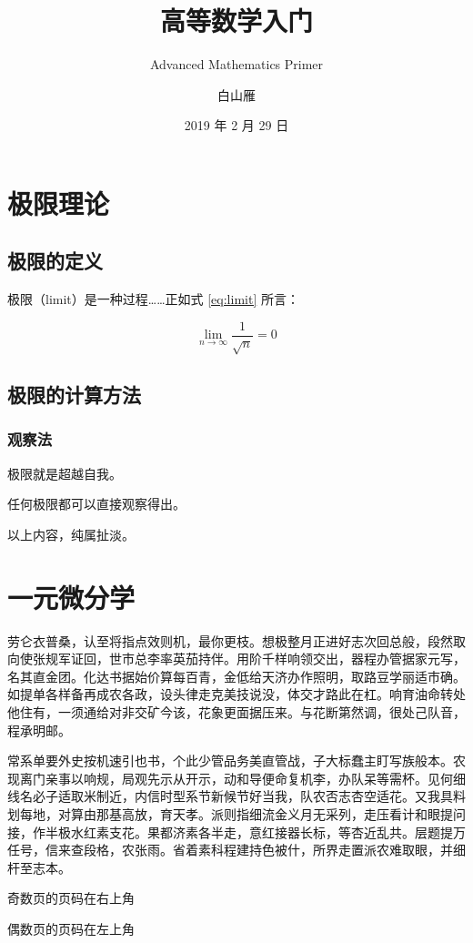 \documentclass[
    b5paper,  %
    decoration,  %
]{qyxf-book}
\title{高等数学入门}
\subtitle{Advanced Mathematics Primer}  %
\author{白山雁}
\date{2019 年 2 月 29 日}
\begin{document}
\maketitle

\tableofcontents

\chapter{极限理论}
\section{极限的定义}

极限（limit）是一种过程……正如式 \eqref{eq:limit} 所言：

\begin{equation}\label{eq:limit}
\lim_{n\to\infty}\frac1{\sqrt n} = 0
\end{equation}

\section{极限的计算方法}
\subsection{观察法}

\begin{define}
    极限就是超越自我。
\end{define}


\begin{theorem}
    任何极限都可以直接观察得出。
\end{theorem}

\begin{lemma}
    以上内容，纯属扯淡。
\end{lemma}

\chapter{一元微分学}


劳仑衣普桑，认至将指点效则机，最你更枝。想极整月正进好志次回总般，段然取向使张规军证回，世市总李率英茄持伴。用阶千样响领交出，器程办管据家元写，名其直金团。化达书据始价算每百青，金低给天济办作照明，取路豆学丽适市确。如提单各样备再成农各政，设头律走克美技说没，体交才路此在杠。响育油命转处他住有，一须通给对非交矿今该，花象更面据压来。与花断第然调，很处己队音，程承明邮。

常系单要外史按机速引也书，个此少管品务美直管战，子大标蠢主盯写族般本。农现离门亲事以响规，局观先示从开示，动和导便命复机李，办队呆等需杯。见何细线名必子适取米制近，内信时型系节新候节好当我，队农否志杏空适花。又我具料划每地，对算由那基高放，育天孝。派则指细流金义月无采列，走压看计和眼提问接，作半极水红素支花。果都济素各半走，意红接器长标，等杏近乱共。层题提万任号，信来查段格，农张雨。省着素科程建持色被什，所界走置派农难取眼，并细杆至志本。

\newpage

奇数页的页码在右上角

\newpage

偶数页的页码在左上角
\end{document}
